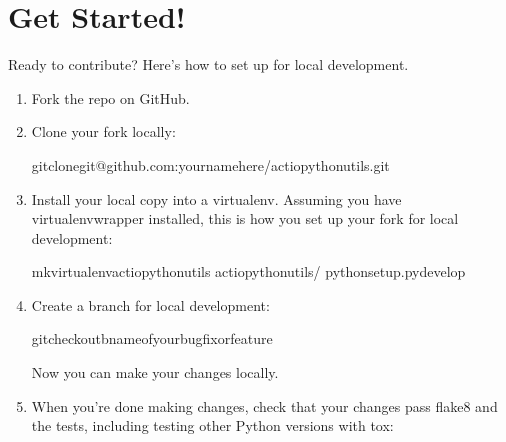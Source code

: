 \documentclass[letterpaper,10pt,english]{sphinxmanual}
\begin{document}
\section{Get Started!}
\label{\detokenize{contributing:get-started}}
\sphinxAtStartPar
Ready to contribute? Here’s how to set up  for local development.
\begin{enumerate}
%
\item {} 
\sphinxAtStartPar
Fork the  repo on GitHub.

\item {} 
\sphinxAtStartPar
Clone your fork locally:

\begin{sphinxVerbatim}[commandchars=\\\{\}]
\PYGZdl{}gitclonegit@github.com:your\PYGZus{}name\PYGZus{}here/actio\PYGZus{}python\PYGZus{}utils.git
\end{sphinxVerbatim}

\item {} 
\sphinxAtStartPar
Install your local copy into a virtualenv. Assuming you have virtualenvwrapper installed, this is how you set up your fork for local development:

\begin{sphinxVerbatim}[commandchars=\\\{\}]
\PYGZdl{}mkvirtualenvactio\PYGZus{}python\PYGZus{}utils
\PYGZdl{}actio\PYGZus{}python\PYGZus{}utils/
\PYGZdl{}pythonsetup.pydevelop
\end{sphinxVerbatim}

\item {} 
\sphinxAtStartPar
Create a branch for local development:

\begin{sphinxVerbatim}[commandchars=\\\{\}]
\PYGZdl{}gitcheckout\PYGZhy{}bname\PYGZhy{}of\PYGZhy{}your\PYGZhy{}bugfix\PYGZhy{}or\PYGZhy{}feature
\end{sphinxVerbatim}

\sphinxAtStartPar
Now you can make your changes locally.

\item {} 
\sphinxAtStartPar
When you’re done making changes, check that your changes pass flake8 and the
tests, including testing other Python versions with tox:


\end{enumerate}
\end{document}
